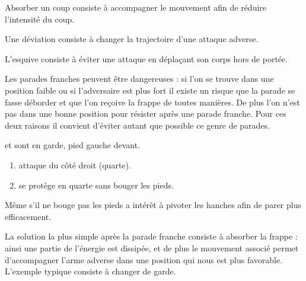 \begin{definition}[Absorption]

Absorber un coup consiste à accompagner le mouvement afin de réduire l'intensité du coup.

\end{definition}


\begin{definition}[Déviation]

Une déviation consiste à changer la trajectoire d'une attaque adverse.

\end{definition}


\begin{definition}[Esquive]

L'esquive consiste à éviter une attaque en déplaçant son corps hors de portée.

\end{definition}


Les parades franches peuvent être dangereuses : si l'on se trouve dans une position faible ou si l'adversaire est plus fort il existe un risque que la parade se fasse déborder et que l'on reçoive la frappe de toutes manières.
De plus l'on n'est pas dans une bonne position pour résister après une parade franche.
Pour ces deux raisons il convient d'éviter autant que possible ce genre de parades.


\begin{exercice}

\A et \D sont en garde, pied gauche devant.

\begin{enumerate}
	\item \A attaque \D du côté droit (quarte).
	
	\item \D se protège en quarte sans bouger les pieds.
\end{enumerate}

Même s'il ne bouge pas les pieds \D a intérêt à pivoter les hanches afin de parer plus efficacement.

\end{exercice}


La solution la plus simple après la parade franche consiste à absorber la frappe : ainsi une partie de l'énergie est dissipée, et de plus le mouvement associé permet d'accompagner l'arme adverse dans une position qui nous est plus favorable.
L'exemple typique consiste à changer de garde.



